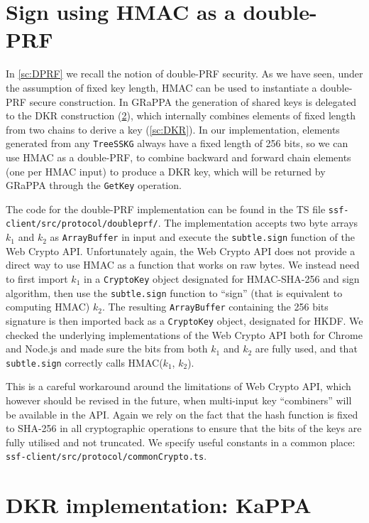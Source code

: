 \section{Sign using HMAC as a double-PRF}\label{sc:ssf-double-prf}
In \cref{sc:DPRF} we recall the notion of double-PRF security.
As we have seen, under the assumption of fixed key length, HMAC 
can be used to instantiate a double-PRF secure construction.
In GRaPPA the generation of shared keys is delegated to the
DKR construction (\cref{sc:DKR-implementation}), which 
internally combines elements of fixed
length from two chains to derive a key (\cref{sc:DKR}).
In our implementation, elements generated from any \texttt{TreeSSKG}
always have a fixed length of 256 bits, so we can use HMAC as a
double-PRF, to 
combine backward and forward chain elements 
(one per HMAC input) to
produce a DKR key, which will be returned by GRaPPA through
the \texttt{GetKey} operation.

The code for the double-PRF implementation can be found in the TS file {\texttt{ssf-client/src/protocol/doubleprf/}}.
The implementation accepts two byte arrays $k_1$ and $k_2$ 
as \texttt{ArrayBuffer} in input and execute the {\texttt{subtle.sign}} 
function of the Web Crypto API. 
Unfortunately again, the Web Crypto API does not provide a direct way to
use HMAC as a function that works on raw bytes. We instead
need to first import $k_1$ in a \texttt{CryptoKey} object
designated for HMAC-SHA-256 and sign algorithm,
then use the \texttt{subtle.sign} function to ``sign''
(that is equivalent to computing HMAC) $k_2$.
The resulting \texttt{ArrayBuffer} containing the
256 bits signature is then imported back as
a \texttt{CryptoKey} object, designated for HKDF.
We checked the underlying implementations of the Web Crypto API
both for Chrome and Node.js and made sure the bits
from both $k_1$ and $k_2$ are fully used, and that
\texttt{subtle.sign} correctly calls HMAC($k_1$, $k_2$).

This is a careful workaround around the limitations
of Web Crypto API, which however should be revised
in the future, when multi-input key ``combiners''
will be available in the API.
Again we rely on the fact that the hash function is
fixed to SHA-256 in all cryptographic operations
to ensure that the bits of the keys are fully utilised
and not truncated. We specify useful constants
in a common place: \texttt{ssf-client/src/protocol/commonCrypto.ts}.

\section{DKR implementation: KaPPA}\label{sc:DKR-implementation}

